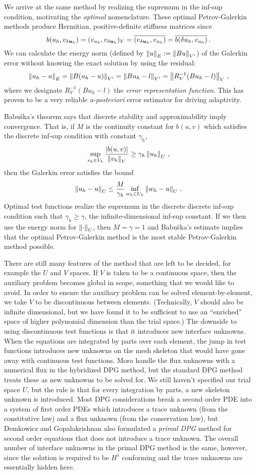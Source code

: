 \documentclass[Proposal.tex]{subfiles}
\begin{document}
We arrive at the same method by realizing the supremum in the inf-sup condition, motivating the \emph{optimal} nomenclature.
These optimal Petrov-Galerkin methods produce Hermitian, positive-definite stiffness matrices since
\[
b(u_h,v_{\delta\boldsymbol{u}_h})=(v_{u_h},v_{\delta\boldsymbol{u}_h})_V=\overline{(v_{\delta\boldsymbol{u}_h},v_{u_h})}=\overline{b(\delta u_h,v_{u_h})}\,.
\]
We can calculate the energy norm (defined by $\left\| u \right\|_E:=\left\| Bu \right\|_{V'}$) of the Galerkin error without knowing the exact solution by using the residual:
\[
\left\| u_h-u \right\|_E=\left\| B(u_h-u) \right\|_{V'}=\left\| Bu_h-l \right\|_{V'}=\left\| R_V^{-1}(Bu_h-l) \right\|_V\,,
\]
where we designate $R_V^{-1}(Bu_h-l)$ the \emph{error representation function}.
This has proven to be a very reliable \emph{a-posteriori} error estimator for driving adaptivity.

Babu\v{s}ka's theorem\cite{Babuska70} says that discrete stability and approximability imply convergence.
That is, if $M$ is the continuity constant for $b(u,v)$ which satisfies the discrete inf-sup condition with constant $\gamma_h$,
\[
\sup_{v_h\in V_h}\frac{|b(u,v)|}{\left\| v_h \right\|_V}\geq\gamma_h\left\| u_h \right\|_U\,,
\]
then the Galerkin error satisfies the bound
\[
\left\| u_h-u \right\|_U\leq\frac{M}{\gamma_h}\inf_{w_h\in U_h}\left\| w_h-u \right\|_U\,.
\]
Optimal test functions realize the supremum in the discrete discrete inf-sup condition such that $\gamma_h\geq\gamma$, 
the infinite-dimensional inf-sup constant.
If we then use the energy norm for $\left\| \cdot \right\|_U$, then $M=\gamma=1$ and Babu\v{s}ka's estimate implies that
the optimal Petrov-Galerkin method is the most stable Petrov-Galerkin method possible.

There are still many features of the method that are left to be decided, for example the $U$ and $V$ spaces.
If $V$ is taken to be a continuous space, then the auxiliary problem becomes global in scope, something that we would like to avoid.
In order to ensure the auxiliary problem can be solved element-by-element, we take $V$ to be discontinuous between elements.
(Technically, $V$ should also be infinite dimensional, but we have found it to be sufficient to use an ``enriched'' space of higher
polynomial dimension than the trial space.)
The downside to using discontinuous test functions is that it introduces new interface unknowns.
When the equations are integrated by parts over each element, the jump in test functions introduces new unknowns on the mesh skeleton
that would have gone away with continuous test functions.
Moro \etal\cite{MoroNguyenPeraire11} handle the flux unknowns with a numerical flux in the hybridized DPG method, but the standard DPG method treats
these as new unknowns to be solved for.
We still haven't specified our trial space $U$, but the rule is that for every integration by parts, a new skeleton unknown is introduced.
Most DPG considerations break a second order PDE into a system of first order PDEs which introduces a trace unknown (from the constitutive law) 
and a flux unknown (from the conservation law), but Demkowicz and Gopalakrishnan also formulated a \emph{primal DPG} method for second order equations
that does not introduce a trace unknown.
The overall number of interface unknowns in the primal DPG method is the same, however, since the solution is required to be $H^1$ conforming 
and the trace unknowns are essentially hidden here.
\end{document}
